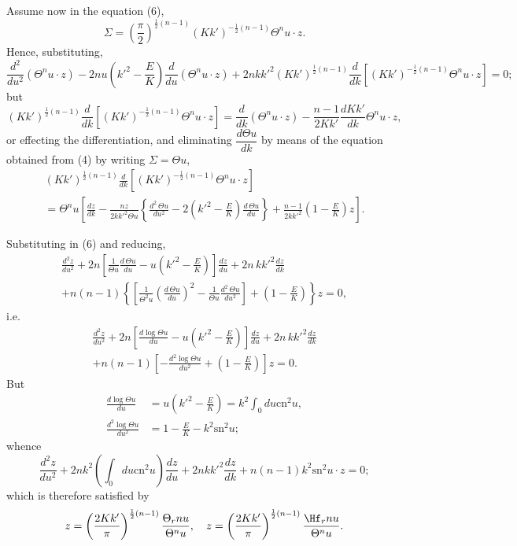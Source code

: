 \documentclass[11pt,a4paper]{book}
\providecommand{\sn}{\mathrm{sn}}
\providecommand{\cn}{\mathrm{cn}}
\begin{document}
Assume now in the equation (6),
\[
\Sigma = \left(\frac{\pi}{2}\right)^{\frac{1}{2}(n-1)} (Kk')^{-\frac{1}{2}(n-1)} \Theta^n u \cdot z.
\]
Hence, substituting,
\[
\frac{d^2}{du^2}(\Theta^n u \cdot z) - 2nu\left(k'^2 - \frac{E}{K}\right) \frac{d}{du}(\Theta^n u \cdot z) + 2nkk'^2 (Kk')^{\frac{1}{2}(n-1)} \frac{d}{dk}[(Kk')^{-\frac{1}{2}(n-1)} \Theta^n u \cdot z] = 0;
\]
but
\[
(Kk')^{\frac{1}{2}(n-1)} \frac{d}{dk}[(Kk')^{-\frac{1}{2}(n-1)} \Theta^n u \cdot z] = \frac{d}{dk}(\Theta^n u \cdot z) - \frac{n-1}{2Kk'} \frac{dKk'}{dk} \Theta^n u \cdot z,
\]
or effecting the differentiation, and eliminating $\dfrac{d\Theta u}{dk}$ by means of the equation obtained from (4) by writing $\Sigma = \Theta u$,
\begin{multline*}
(Kk')^{\frac{1}{2}(n-1)} \frac{d}{dk}[(Kk')^{-\frac{1}{2}(n-1)} \Theta^n u \cdot z] \\
= \Theta^n u \left[\frac{dz}{dk} - \frac{nz}{2kk'^2 \Theta u} \left\{\frac{d^2\,\Theta u}{du^2} - 2\left(k'^2 - \frac{E}{K}\right) \frac{d\,\Theta u}{du}\right\} + \frac{n-1}{2kk'^2}\left(1 - \frac{E}{K}\right)z\right].
\end{multline*}

Substituting in (6) and reducing,
\begin{multline*}
\frac{d^2 z}{du^2} + 2n \left[\frac{1}{\Theta u} \frac{d\,\Theta u}{du} - u\left(k'^2 - \frac{E}{K}\right)\right] \frac{dz}{du} + 2n\, kk'^2 \frac{dz}{dk} \\
+ n(n-1) \left\{\left[\frac{1}{\Theta^2 u}\left(\frac{d\,\Theta u}{du}\right)^2 - \frac{1}{\Theta u} \frac{d^2\,\Theta u}{du^2}\right] + \left(1 - \frac{E}{K}\right)\right\} z = 0,
\end{multline*}
i.e.
\begin{multline*}
\frac{d^2 z}{du^2} + 2n \left[\frac{d\log\Theta u}{du} - u\left(k'^2 - \frac{E}{K}\right)\right] \frac{dz}{du} + 2n\, kk'^2 \frac{dz}{dk} \\
+ n(n-1) \left[-\frac{d^2\log\Theta u}{du^2} + \left(1 - \frac{E}{K}\right)\right] z = 0.
\end{multline*}
But
\begin{align*}
\frac{d\log\Theta u}{du} &= u\left(k'^2 - \frac{E}{K}\right) = k^2 \int_0 du \cn^2 u, \\
\frac{d^2\log\Theta u}{du^2} &= 1 - \frac{E}{K} - k^2 \sn^2 u;
\end{align*}
whence
\[
\frac{d^2 z}{du^2} + 2nk^2 \left(\int_0 du \cn^2 u\right) \frac{dz}{du} + 2nkk'^2 \frac{dz}{dk} + n(n-1)k^2 \sn^2 u \cdot z = 0 \tag{7};
\]
which is therefore satisfied by
\[
z = \left(\frac{2Kk'}{\pi}\right)^{\frac{1}{2}(n-1)} \frac{\Theta_r nu}{\Theta^n u}, \quad z = \left(\frac{2Kk'}{\pi}\right)^{\frac{1}{2}(n-1)} \frac{\Hf_r nu}{\Theta^n u}.
\]
\end{document}

